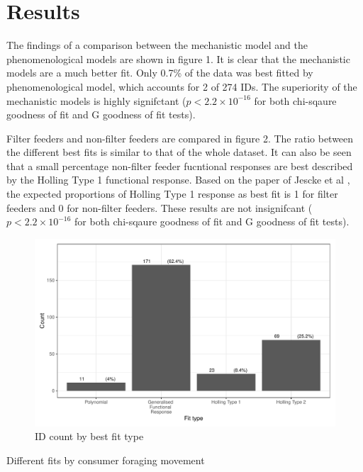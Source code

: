 \documentclass[11pt, a4paper, titlepage]{article}
\begin{document}
\section{Results}

The findings of a comparison between the mechanistic model and the phenomenological models are shown in figure 1. It is clear that the mechanistic models are a much better fit. Only 0.7\% of the data was best fitted by phenomenological model, which accounts for 2 of 274 IDs. The superiority of the mechanistic models is highly signifctant ($p < 2.2\times10^{-16}$ for both chi-sqaure goodness of fit and G goodness of fit tests). 

Filter feeders and non-filter feeders are compared in figure 2. The ratio between the different best fits is similar to that of the whole dataset. It can also be seen that a small percentage non-filter feeder fucntional responses are best described by the Holling Type 1 functional response. Based on the paper of Jescke et al \parencite{Jeschke2004}, the expected proportions of Holling Type 1 response as best fit is 1 for filter feeders and 0 for non-filter feeders. These results are not insignifcant ($p < 2.2\times10^{-16}$ for both chi-sqaure goodness of fit and G goodness of fit tests). 

\begin{figure}[ht!]
	\centering\includegraphics[width=1\textwidth]{../Results/Model_Comparison_Barchart.pdf}
	\caption{ID count by best fit type}
\end{figure}

\begin{table}[ht!]
\centering{}
\caption{Different fits by consumer foraging movement}
\end{table}
\end{document}
